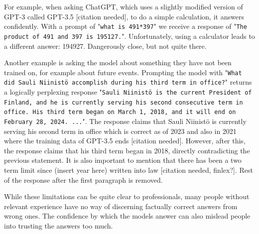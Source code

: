 \documentclass[twoside]{article}
\begin{document}
For example, when asking ChatGPT, which uses a slightly modified version of GPT-3 called 
GPT-3.5 [citation needed], to do a simple calculation, it answers confidently. 
With a prompt of "\texttt{what is 491*397}" we receive a response of 
"\texttt{The product of 491 and 397 is 195127.}". Unfortunately, using a calculator
leads to a different answer: 194927. Dangerously close, but not quite there.

Another example is asking the model about something they have not been trained on, for
example about future events. Prompting the model with 
"\texttt{What did Sauli Niinistö accomplish during his third term in office?}" returns
a logically perplexing response "\texttt{Sauli Niinistö is the current President of Finland, 
and he is currently serving his second consecutive term in office. 
His third term began on March 1, 2018, and it will end on February 28, 2024. ...}".
The response claims that Sauli Niinistö is currently serving his second term in office
which is correct as of 2023 and also in 2021 where the training data of GPT-3.5 ends 
[citation needed]. However, after this, the response claims that his third term began
in 2018, directly contradicting the previous statement. It is also important to mention
that there has been a two term limit since (insert year here) written into law 
[citation needed, finlex?]. Rest of the response after the first paragraph is removed.

While these limitations can be quite clear to professionals, many people without relevant
experience have no way of discerning factually correct answers from wrong ones. The confidence
by which the models answer can also mislead people into trusting the answers too much.



\printbibliography
\end{document}
